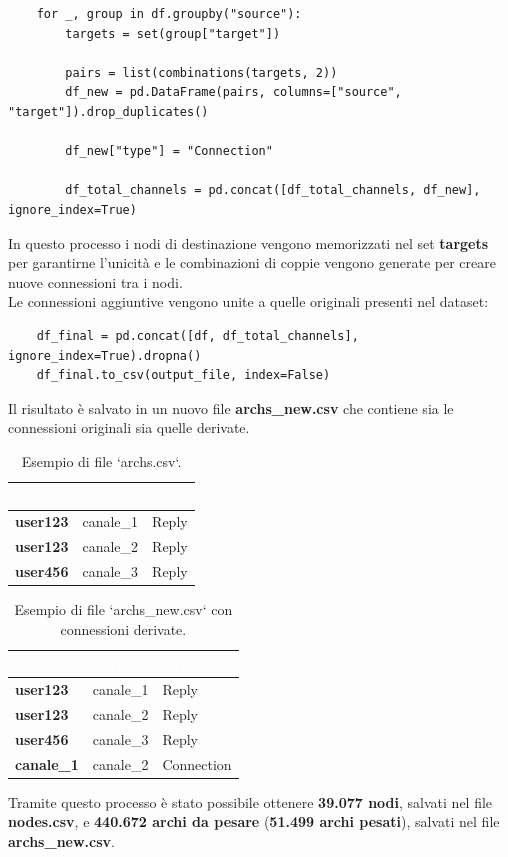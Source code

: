 \documentclass[12pt]{article}
\begin{document}
	\begin{lstlisting}
	for _, group in df.groupby("source"):
		targets = set(group["target"])
		
		pairs = list(combinations(targets, 2))
		df_new = pd.DataFrame(pairs, columns=["source", "target"]).drop_duplicates()
		
		df_new["type"] = "Connection"
		
		df_total_channels = pd.concat([df_total_channels, df_new], ignore_index=True)
	\end{lstlisting}
	In questo processo i nodi di destinazione vengono memorizzati nel set \textbf{targets} per garantirne l'unicità e le combinazioni di coppie vengono generate per creare nuove connessioni tra i nodi.\\
	Le connessioni aggiuntive vengono unite a quelle originali presenti nel dataset:
	\begin{lstlisting}
	df_final = pd.concat([df, df_total_channels], ignore_index=True).dropna()
	df_final.to_csv(output_file, index=False)
	\end{lstlisting}
	Il risultato è salvato in un nuovo file \textbf{archs\_new.csv} che contiene sia le connessioni originali sia quelle derivate.
	\begin{table}[H]
		\centering
		\begin{tabular}{|p{5cm}|p{4cm}|p{4cm}|}
			\hline
			\cellcolor{darkblue}\textcolor{white}{\textbf{Source}} & 
			\cellcolor{darkblue}\textcolor{white}{\textbf{Target}} & 
			\cellcolor{darkblue}\textcolor{white}{\textbf{Type}} \\
			\hline
			\textbf{user123} & canale\_1 & Reply \\
			\hline
			\textbf{user123} & canale\_2 & Reply\\
			\hline
			\textbf{user456} & canale\_3 & Reply\\
			\hline
		\end{tabular}
		\caption{Esempio di file `archs.csv`.}
		\label{tab:archs.csv}
	\end{table}
	\begin{table}[H]
		\centering
		\begin{tabular}{|p{5cm}|p{4cm}|p{4cm}|}
			\hline
			\cellcolor{darkblue}\textcolor{white}{\textbf{Source}} & 
			\cellcolor{darkblue}\textcolor{white}{\textbf{Target}} & 
			\cellcolor{darkblue}\textcolor{white}{\textbf{Type}} \\
			\hline
			\textbf{user123} & canale\_1 & Reply \\
			\hline
			\textbf{user123} & canale\_2 & Reply\\
			\hline
			\textbf{user456} & canale\_3 & Reply\\
			\hline
			\textbf{canale\_1} & canale\_2 & Connection\\
			\hline
		\end{tabular}
		\caption{Esempio di file `archs\_new.csv` con connessioni derivate.}
		\label{tab:archs_new}
	\end{table}
	Tramite questo processo è stato possibile ottenere \textbf{39.077 nodi}, salvati nel file \textbf{nodes.csv}, e \textbf{440.672 archi da pesare} (\textbf{51.499 archi pesati}), salvati nel file \textbf{archs\_new.csv}.
\end{document}
